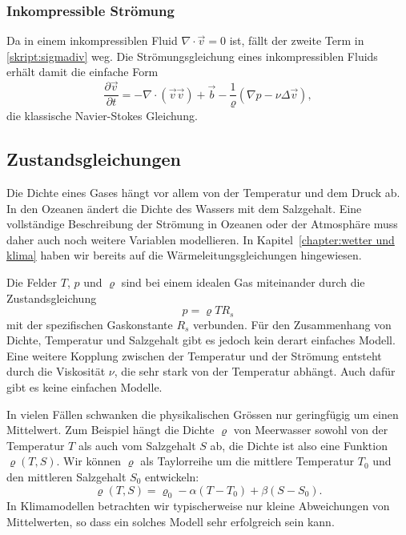 \subsubsection{Inkompressible Strömung}
Da in einem inkompressiblen Fluid $\nabla\cdot\vec{v}=0$ ist, fällt
der zweite Term in \eqref{skript:sigmadiv} weg.
Die Strömungsgleichung eines inkompressiblen Fluids erhält damit die
einfache Form
\begin{equation}
\frac{\partial\vec{v}}{\partial t}
=
-\nabla\cdot(\vec{v}\vec{v})
+\vec{b}
-\frac1{\varrho}(\nabla p
-\nu\Delta\vec{v}),
\label{skript:inkompressibel newtonsch}
\end{equation}
die klassische Navier-Stokes Gleichung.
%

\subsection{Zustandsgleichungen}
Die Dichte eines Gases hängt vor allem von der Temperatur und dem Druck ab.
In den Ozeanen ändert die Dichte des Wassers mit dem Salzgehalt.
Eine vollständige Beschreibung der Strömung in Ozeanen oder der
Atmosphäre muss daher auch noch weitere Variablen modellieren.
In Kapitel~\ref{chapter:wetter und klima} haben wir bereits auf die
Wärmeleitungsgleichungen hingewiesen.

Die Felder $T$, $p$ und $\varrho$ sind bei einem idealen Gas miteinander
durch die Zustandsgleichung
\[
p=\varrho T R_s
\]
mit der spezifischen Gaskonstante $R_s$ verbunden.
Für den Zusammenhang von Dichte, Temperatur und Salzgehalt gibt
es jedoch kein derart einfaches Modell.
Eine weitere Kopplung zwischen der Temperatur und der
Strömung entsteht durch die Viskosität $\nu$, die sehr stark
von der Temperatur abhängt.
Auch dafür gibt es keine einfachen Modelle.

In vielen Fällen schwanken die physikalischen Grössen nur geringfügig
um einen Mittelwert.
Zum Beispiel hängt die Dichte $\varrho$ von Meerwasser sowohl von
der Temperatur $T$ als auch vom Salzgehalt $S$ ab, die Dichte ist
also eine Funktion $\varrho(T,S)$.
Wir können $\varrho$ als Taylorreihe um die mittlere Temperatur $T_0$
und den mittleren Salzgehalt $S_0$ entwickeln:
\[
\varrho(T,S)
=
\varrho_0 -\alpha(T-T_0) + \beta(S-S_0).
\]
In Klimamodellen betrachten wir typischerweise nur kleine Abweichungen
von Mittelwerten, so dass ein solches Modell sehr erfolgreich sein kann.

